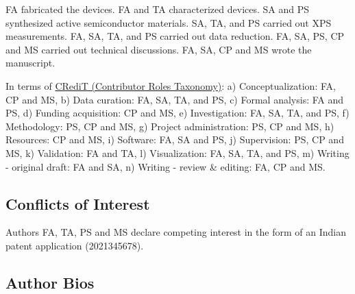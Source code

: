 \documentclass[12 pt]{article}
\begin{document}
FA fabricated the devices. FA and TA characterized devices. SA and PS synthesized active semiconductor materials. SA, TA, and PS carried out XPS measurements. FA, SA, TA, and PS carried out data reduction. FA, SA, PS, CP and MS carried out technical discussions. FA, SA, CP and MS wrote the manuscript.

In terms of \href{https://casrai.org/credit/}{CRediT (Contributor Roles Taxonomy)}: a) Conceptualization: FA, CP and MS, b) Data curation: FA, SA, TA, and PS, c) Formal analysis: FA and PS, d) Funding acquisition: CP and MS, e) Investigation: FA, SA, TA, and PS, f) Methodology: PS, CP and MS, g) Project administration: PS, CP and MS, h) Resources: CP and MS, i) Software: FA, SA and PS, j) Supervision: PS, CP and MS, k) Validation: FA and TA, l) Visualization: FA, SA, TA, and PS, m) Writing - original draft: FA and SA, n) Writing - review \& editing: FA, CP and MS.

\subsection*{Conflicts of Interest}
Authors FA, TA, PS and MS declare competing interest in the form of an Indian patent application (2021345678).

\subsection*{Author Bios}
  
\end{document}
